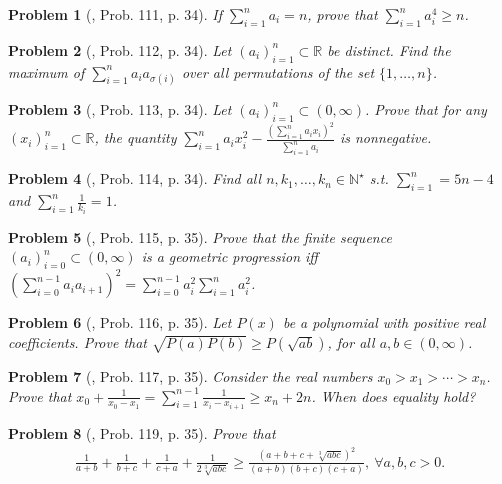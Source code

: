 \documentclass[oneside]{book}
\numberwithin{equation}{section}
\newtheorem{problem}{Problem}[section]
\begin{document}
\begin{problem}[\cite{Gelca_Andreescu2017}, Prob. 111, p. 34]
	If $\sum_{i=1}^n a_i = n$, prove that $\sum_{i=1}^n a_i^4\ge n$.
\end{problem}

\begin{problem}[\cite{Gelca_Andreescu2017}, Prob. 112, p. 34]
	Let $(a_i)_{i=1}^n\subset\mathbb{R}$ be distinct. Find the maximum of $\sum_{i=1}^n a_ia_{\sigma(i)}$ over all permutations of the set $\{1,\ldots,n\}$.
\end{problem}

\begin{problem}[\cite{Gelca_Andreescu2017}, Prob. 113, p. 34]
	Let $(a_i)_{i=1}^n\subset(0,\infty)$. Prove that for any $(x_i)_{i=1}^n\subset\mathbb{R}$, the quantity $\sum_{i=1}^n a_ix_i^2 - \frac{\left(\sum_{i=1}^n a_ix_i\right)^2}{\sum_{i=1}^n a_i}$ is nonnegative.
\end{problem}

\begin{problem}[\cite{Gelca_Andreescu2017}, Prob. 114, p. 34]
	Find all $n,k_1,\ldots,k_n\in\mathbb{N}^\star$ s.t. $\sum_{i=1}^n = 5n - 4$ and $\sum_{i=1}^n \frac{1}{k_i} = 1$.
\end{problem}

\begin{problem}[\cite{Gelca_Andreescu2017}, Prob. 115, p. 35]
	Prove that the finite sequence $(a_i)_{i=0}^n\subset(0,\infty)$ is a geometric progression iff $\left(\sum_{i=0}^{n-1} a_ia_{i+1}\right)^2 = \sum_{i=0}^{n-1} a_i^2\sum_{i=1}^n a_i^2$.
\end{problem}

\begin{problem}[\cite{Gelca_Andreescu2017}, Prob. 116, p. 35]
	Let $P(x)$ be a polynomial with positive real coefficients. Prove that $\sqrt{P(a)P(b)}\ge P(\sqrt{ab})$, for all $a,b\in(0,\infty)$.
\end{problem}

\begin{problem}[\cite{Gelca_Andreescu2017}, Prob. 117, p. 35]
	Consider the real numbers $x_0 > x_1 > \cdots > x_n$. Prove that $x_0 + \frac{1}{x_0 - x_1} = \sum_{i=1}^{n-1} \frac{1}{x_i - x_{i+1}}\ge x_n + 2n$. When does equality hold?
\end{problem}

\begin{problem}[\cite{Gelca_Andreescu2017}, Prob. 119, p. 35]
	Prove that
	\begin{align*}
		\frac{1}{a + b} + \frac{1}{b + c} + \frac{1}{c + a} + \frac{1}{2\sqrt[3]{abc}}\ge\frac{\left(a + b + c + \sqrt[3]{abc}\right)^2}{(a + b)(b + c)(c + a)},\ \forall a,b,c > 0.
	\end{align*}
\end{problem}
\end{document}
